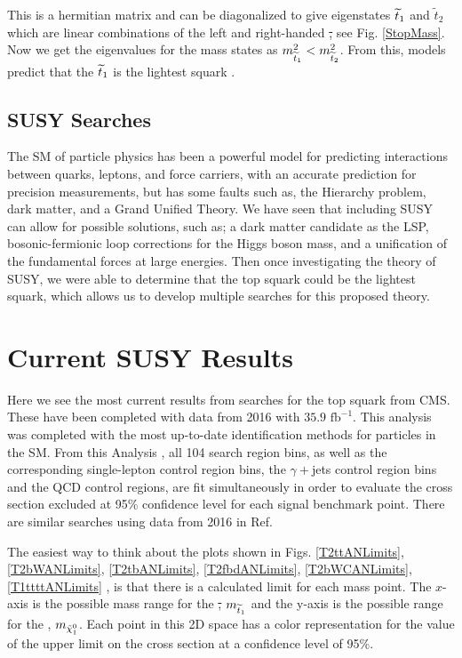 This is a hermitian matrix and can be diagonalized to give eigenstates $\widetilde{t}_1$ and $\widetilde{t}_2$ which are linear combinations of the left and right-handed \st, see Fig. \ref{StopMass}. Now we get the eigenvalues for the mass states as $m_{\widetilde{t}_1}^2<m_{\widetilde{t}_2}^2$. From this, models predict that the $\widetilde{t}_1$ is the lightest squark \cite{martin_supersymmetry_1997}. 

\subsection{SUSY Searches}
The SM of particle physics has been a powerful model for predicting interactions between quarks, leptons, and force carriers, with an accurate prediction for precision measurements, but has some faults such as, the Hierarchy problem, dark matter, and a Grand Unified Theory. We have seen that including SUSY can allow for possible solutions, such as; a dark matter candidate as the LSP, bosonic-fermionic loop corrections for the Higgs boson mass, and a unification of the fundamental forces at large energies. Then once investigating the theory of SUSY, we were able to determine that the top squark could be the lightest squark, which allows us to develop multiple searches for this proposed theory. 

\section{Current SUSY Results}\label{CurrentResults}

Here we see the most current results from searches for the top squark from CMS. These have been completed with data from 2016 with $35.9 \text{ fb}^{-1}$. This analysis was completed with the most up-to-date identification methods for particles in the SM. From this Analysis \cite{cms_collaboration_search_2016}, all 104 search region bins, as well as the corresponding single-lepton control region bins, the $\gamma+$jets control region bins and the QCD control regions, are fit simultaneously in order to evaluate the cross section excluded at 95\% confidence level for each signal benchmark point. There are similar searches using data from 2016 in Ref. \cite{atlas_collaboration_search_2017, cms_collaboration_search_2017, sirunyan_search_2017-1, sirunyan_search_2017, cms_collaboration_search_2017-1}

The easiest way to think about the plots shown in Figs. \ref{T2ttANLimits}, \ref{T2bWANLimits}, \ref{T2tbANLimits}, \ref{T2fbdANLimits}, \ref{T2bWCANLimits}, \ref{T1ttttANLimits} \cite{alwall_simplified_2009, alwall_model-independent_2009, feng_dark_2010}, is that there is a calculated limit for each mass point. The $x$-axis is the possible mass range for the \st, $m_{\widetilde{t}_1}$ and the y-axis is the possible range for the \neutralino, $m_{\tilde{\chi}^{0}_{1}}$. Each point in this 2D space has a color representation for the value of the upper limit on the cross section at a confidence level of 95\%. 

